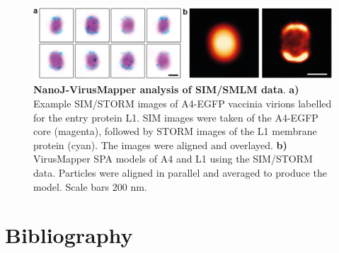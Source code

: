 \newpage

\begin{figure}
    \centering
    \includegraphics{Figures/dSTORM_Sup_L1.png}
    \caption{\textbf{NanoJ-VirusMapper analysis of SIM/SMLM data}. \textbf{a)} Example SIM/STORM images of A4-EGFP vaccinia virions labelled for the entry protein L1. SIM images were taken of the A4-EGFP core (magenta), followed by STORM images of the L1 membrane protein (cyan). The images were aligned and overlayed. \textbf{b)} VirusMapper SPA models of A4 and L1 using the SIM/STORM data. Particles were aligned in parallel and averaged to produce the model. Scale bars 200 nm.}
    \label{fig:supVM}
\end{figure}

\newpage
\section*{Bibliography}




